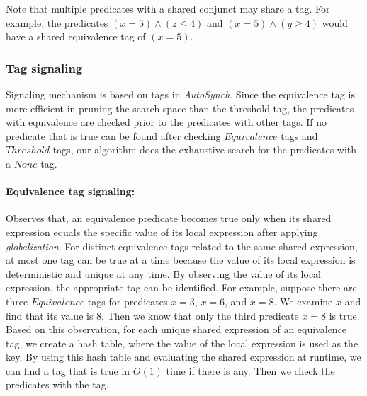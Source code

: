 \documentclass{sigplanconf}
\begin{document}
Note that multiple predicates with a shared conjunct may share a tag. For example,
the predicates $(x=5) \wedge (z \leq 4)$ and $(x=5) \wedge (y \geq 4)$ would have a shared equivalence tag
of $(x=5)$.

\subsubsection{Tag signaling}
Signaling mechanism is based on tags in {\em AutoSynch}. 
Since the equivalence tag is more efficient in pruning the search space than the threshold tag, the
predicates with equivalence are checked prior to the predicates with other 
tags. If no predicate that is true can be found after checking $Equivalence$ 
tags and $Threshold$ tags, our algorithm does the exhaustive search for the 
predicates with a $None$ tag. 

\paragraph{Equivalence tag signaling:}
Observes that, an equivalence predicate becomes true only when its shared 
expression equals the specific value of its local expression after applying
{\em globalization}. For distinct equivalence tags related to the same shared 
expression, at most one tag can be true at a time because the value of its
local expression is deterministic and unique at any time. By 
observing the value of its local expression, the appropriate tag can be 
identified. For example, suppose there are three $Equivalence$ tags for
predicates $x = 3$, $x = 6$, and $x = 8$. We examine $x$ and find that
its value is $8$. Then we know that only the third predicate $x = 8$ is true. Based on this 
observation, for each unique shared expression of an equivalence tag, we 
create a hash table, where the value of the local expression is used as the 
key. By using this 
hash table and evaluating the shared expression at runtime, we can find a
tag that is true in $O(1)$ time if there is any. Then we check the predicates 
with the tag. 

\end{document}

